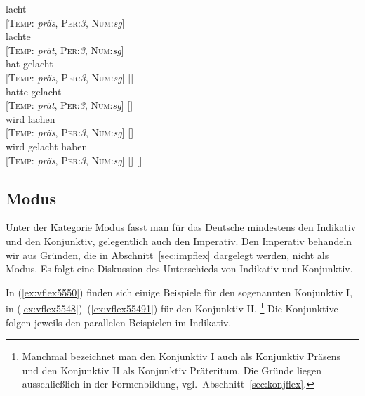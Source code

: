 \begin{exe}
  \ex\label{ex:vsynana}
  \begin{xlist}
    \ex\gll lacht \\
    {[\textsc{Temp}: \textit{präs}, \textsc{Per}:\textit{3}, \textsc{Num}:\textit{sg}]}\\
    \ex\gll lachte \\
    {[\textsc{Temp}: \textit{prät}, \textsc{Per}:\textit{3}, \textsc{Num}:\textit{sg}]}\\
    \ex\gll hat gelacht\\
    {[\textsc{Temp}: \textit{präs}, \textsc{Per}:\textit{3}, \textsc{Num}:\textit{sg}]} {[]}\\
    \ex\gll hatte gelacht\\
    {[\textsc{Temp}: \textit{prät}, \textsc{Per}:\textit{3}, \textsc{Num}:\textit{sg}]} {[]}\\
    \ex\gll wird lachen\\
    {[\textsc{Temp}: \textit{präs}, \textsc{Per}:\textit{3}, \textsc{Num}:\textit{sg}]} {[]}\\
    \ex\gll wird gelacht haben \\
    {[\textsc{Temp}: \textit{präs}, \textsc{Per}:\textit{3}, \textsc{Num}:\textit{sg}]} {[]} {[]}\\
  \end{xlist}
\end{exe}

\subsection{Modus}

\label{sec:modus}

Unter der Kategorie Modus fasst man für das Deutsche mindestens den Indikativ und den Konjunktiv, gelegentlich auch den Imperativ.
Den Imperativ behandeln wir aus Gründen, die in Abschnitt~\ref{sec:impflex} dargelegt werden, nicht als Modus.
Es folgt eine Diskussion des Unterschieds von Indikativ und Konjunktiv.

In (\ref{ex:vflex5550}) finden sich einige Beispiele für den sogenannten Konjunktiv I, in (\ref{ex:vflex5548})--(\ref{ex:vflex55491}) für den Konjunktiv II.%
\footnote{Manchmal bezeichnet man den Konjunktiv I auch als Konjunktiv Präsens und den Konjunktiv II als Konjunktiv Präteritum.
Die Gründe liegen ausschließlich in der Formenbildung, vgl.\ Abschnitt~\ref{sec:konjflex}.}
Die Konjunktive folgen jeweils den parallelen Beispielen im Indikativ.

